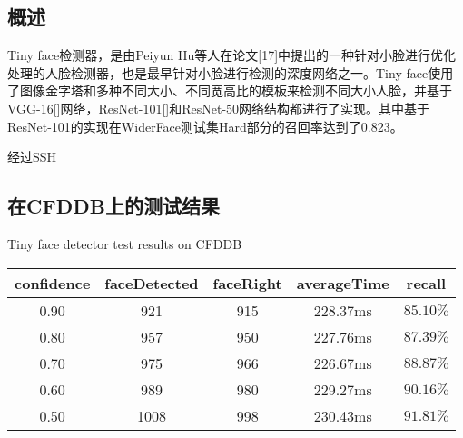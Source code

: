 \subsection{概述}

Tiny face检测器，是由Peiyun Hu等人在论文[17]中提出的一种针对小脸进行优化处理的人脸检测器，也是最早针对小脸进行检测的深度网络之一。Tiny face使用了图像金字塔和多种不同大小、不同宽高比的模板来检测不同大小人脸，并基于VGG-16[]网络，ResNet-101[]和ResNet-50网络结构都进行了实现。其中基于ResNet-101的实现在WiderFace测试集Hard部分的召回率达到了0.823。

经过SSH


\subsection{在CFDDB上的测试结果}

\begin{table}[!hpb]
	\centering
	{Tiny face detector test results on CFDDB}
	\label{tab:tiny}
	\begin{tabular}{ cccc | c }
		\hline
		confidence & faceDetected & faceRight & averageTime & recall\\
		\hline
		0.90 & 921 & 915 & 228.37ms & $85.10\%$\\
		0.80 & 957 & 950 & 227.76ms & $87.39\%$\\
		0.70 & 975 & 966 & 226.67ms & $88.87\%$\\
		0.60 & 989 & 980 & 229.27ms & $90.16\%$\\
		0.50 & 1008 & 998 & 230.43ms & $91.81\%$\\
		\hline
	\end{tabular}
\end{table}

